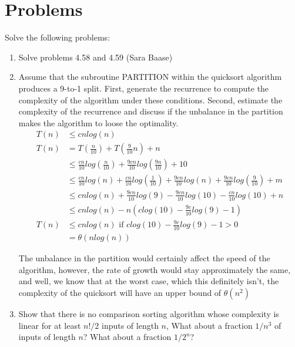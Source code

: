 \documentclass{article}
\begin{document}
\section{Problems}
Solve the following problems:
\begin{enumerate}
    \item Solve problems 4.58 and 4.59 (Sara Baase)

    \item Assume that the subroutine PARTITION within the quicksort algorithm produces a 9-to-1 split. First, generate the recurrence to compute the complexity of the algorithm under these conditions. Second, estimate  the  complexity  of  the  recurrence  and  discuss  if  the unbalance  in  the  partition  makes  the algorithm to loose the optimality.
    \begin{align*}
        T(n) &\leq cn log (n)\\
        T(n) &= T(\frac{n}{10}) + T(\frac{9}{10}n) + n\\
        &\leq \frac{cn}{10} log(\frac{n}{10}) + \frac{9cn}{10} log(\frac{9n}{10}) + 10\\
        &\leq \frac{cn}{10} log(n) + \frac{cn}{10} log(\frac{1}{10}) + \frac{9cn}{10} log(n) + \frac{9cn}{10} log(\frac{9}{10}) + m\\
        &\leq cn log (n) + \frac{9cn}{10}log(9) - \frac{9cn}{10}log(10) -\frac{cn}{10}log(10) + n\\
        &\leq cn log (n) - n(c log(10) - \frac{9c}{10} log(9) - 1)\\
        T(n) &\leq cn log (n) \text{ if } c log(10) - \frac{9c}{10} log(9) - 1 > 0\\
        &= \theta(n log (n))
    \end{align*}

    The unbalance in the partition would certainly affect the speed of the algorithm, however, the rate of growth would stay approximately the same, and well, we know that at the worst case, which this definitely isn't, the complexity of the quicksort will have an upper bound of $\theta(n^2)$

    \item Show that there is no comparison sorting algorithm whose complexity is linear for at least $n!/2$ inputs of length $n$, What about a fraction $1/n^3$ of inputs of length $n$? What about a fraction $1/2^n$?


\end{enumerate}
\end{document}
